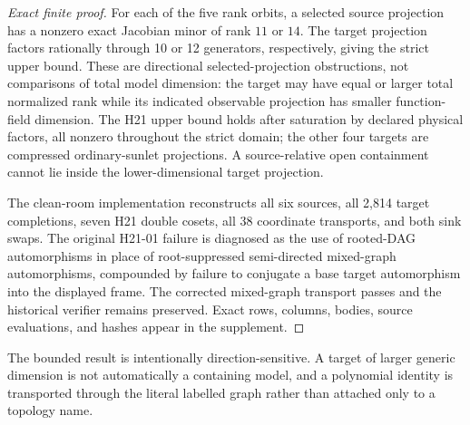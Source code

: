 \begin{proof}[Exact finite proof]
For each of the five rank orbits, a selected source projection has a nonzero
exact Jacobian minor of rank \(11\) or \(14\).  The target projection factors
rationally through 10 or 12 generators, respectively, giving the
strict upper bound.  These are directional selected-projection obstructions,
not comparisons of total model dimension: the target may have equal or
larger total normalized rank while its indicated observable projection has
smaller function-field dimension.  The H21 upper bound holds after saturation
by declared physical factors, all nonzero throughout the strict domain; the
other four targets are compressed ordinary-sunlet projections.  A
source-relative open containment cannot lie inside the lower-dimensional
target projection.

The clean-room implementation reconstructs all six sources, all 2,814
target completions, seven H21 double cosets, all 38 coordinate transports,
and both sink swaps.  The original H21-01 failure is diagnosed as the use of
rooted-DAG automorphisms in place of root-suppressed semi-directed mixed-graph
automorphisms, compounded by failure to conjugate a base target automorphism
into the displayed frame.  The corrected mixed-graph transport passes and
the historical verifier remains preserved.  Exact rows, columns, bodies,
source evaluations, and hashes appear in the supplement.
\end{proof}

The bounded result is intentionally direction-sensitive.  A target of larger
generic dimension is not automatically a containing model, and a polynomial
identity is transported through the literal labelled graph rather than
attached only to a topology name.
